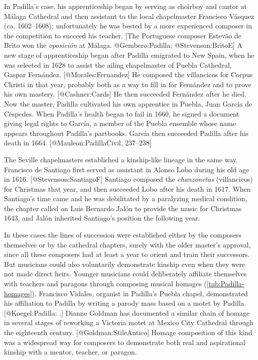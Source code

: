 In Padilla's case, his apprenticeship began by serving as choirboy and cantor at
Málaga Cathedral and then assistant to the local chapelmaster Francisco Vásquez
(ca.  1602--1608); unfortunately he was bested by a more experienced composer in
the competition to succeed his teacher.
[The Portuguese composer Estevão de Brito won the \emph{oposición} at Málaga.
@Gembero:Padilla; @Stevenson:BritoE]
A new stage of apprenticeship began after Padilla emigrated to New Spain, when
he was selected in 1628 to assist the ailing chapelmaster of Puebla Cathedral,
Gaspar Fernández.
[@Morales:Fernandez]
He composed the villancicos for Corpus Christi in that year, probably both as a
way to fill in for Fernández and to prove his own mastery.
[@Cashner:Cards]
He then succeeded Fernández after he died.
Now the master, Padilla cultivated his own apprentice in Puebla, Juan García de
Céspedes.
When Padilla's health began to fail in 1660, he signed a 
document giving legal rights to García, a member of the Puebla ensemble whose
name appears throughout Padilla's partbooks.
García then succeeded Padilla after his death in 1664.
[@Mauleon:PadillaCivil, 237--238]

The Seville chapelmasters established a kinship-like lineage in the same way.
Francisco de Santiago first served as assistant in Alonso Lobo during his old
age in 1616. 
[@Stevenson:SantiagoF]
Santiago composed the \emph{chanzonetas} (villancicos) for Christmas that year, and
then succeeded Lobo after his death in 1617.
When Santiago's time came and he was debilitated by a paralyzing medical
condition, the chapter called on Luis Bernardo Jalón to provide the music for
Christmas 1643, and Jalón inherited Santiago's position the following year.

In these cases the lines of succession were established either by the composers
themselves or by the cathedral chapters, surely with the older master's
approval, since all these composers had at least a year to orient and train
their successors.
But musicians could also voluntarily demonstrate kinship even when they were not
made direct heirs. 
Younger musicians could deliberately affiliate themselves with teachers and
paragons through composing musical homages (\cref{tab:Padilla-homages}).
Francisco Vidales, organist in Padilla's Puebla chapel, demonstrated his
affiliation to Padilla by writing a parody mass based on a motet by Padilla.
[@Koegel:Padilla: 
.] %
Dianne Goldman has documented a similar chain of homage in several stages of
reworking a Victoria motet at Mexico City Cathedral through the eighteenth
century.
[@Goldman:StileAntico]
Homage composition of this kind was a widespread way for composers to
demonstrate both real and aspirational kinship with a mentor, teacher, or
paragon.

